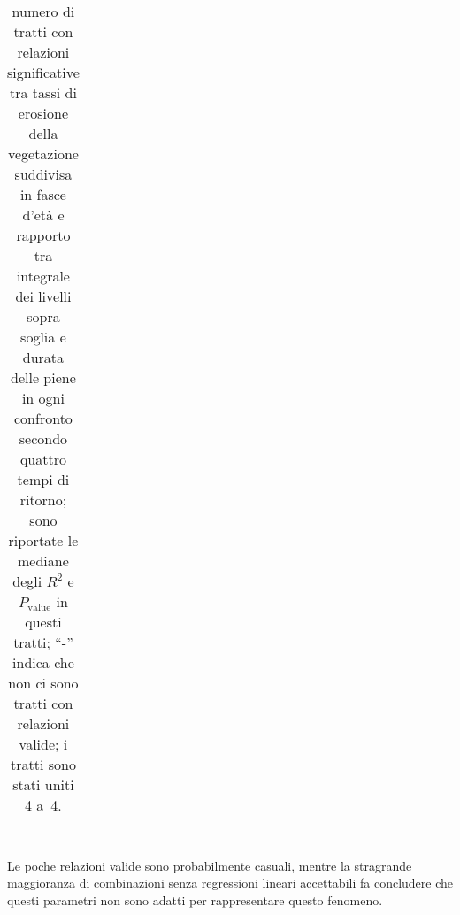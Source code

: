 \begin{table}
\begin{tabular}{c c *{3}{S[table-format = 2.3, table-comparator = true]}}
		\bottomrule
	\end{tabular}
	\caption[numero di tratti nei gruppi di~4 tratti con relazioni significative considerando i tassi di erosione e i livelli medi sopra soglia durante le piene]{numero di tratti con relazioni significative tra tassi di erosione della vegetazione suddivisa in fasce d'età e rapporto tra integrale dei livelli sopra soglia e durata delle piene in ogni confronto secondo quattro tempi di ritorno; sono riportate le mediane degli $R^2$ e $P_\mathrm{value}$ in questi tratti; “-” indica che non ci sono tratti con relazioni valide; i tratti sono stati uniti 4 a~4.}
	\label{tab:iote-4tr-lin-tuttep-ntr-r2-pval}
\end{table}
%
\\
Le poche relazioni valide sono probabilmente casuali, mentre la stragrande maggioranza di combinazioni senza regressioni lineari accettabili fa concludere che questi parametri non sono adatti per rappresentare questo fenomeno.


